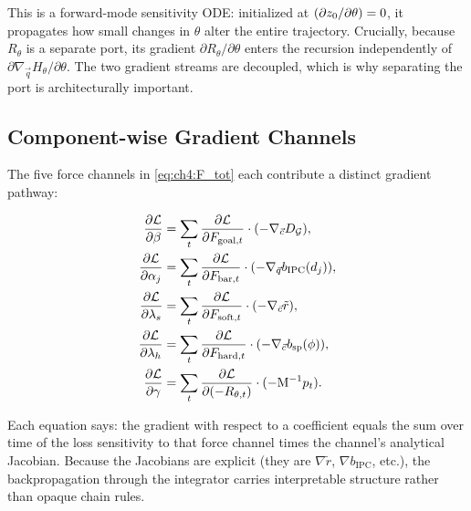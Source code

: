 This is a forward-mode sensitivity ODE: initialized at
$(\partial z_0/\partial\theta) = 0$,
it propagates how small changes in $\theta$ alter the entire trajectory.
Crucially, because $R_\theta$ is a separate port, its gradient
$\partial R_\theta/\partial\theta$ enters the recursion independently
of $\partial\nabla_{\vec{q}} H_\theta/\partial\theta$.
The two gradient streams are decoupled, which is why separating the
port is architecturally important.

\subsection{Component-wise Gradient Channels}
\label{subsec:ch4:grad_channels}

The five force channels in \eqref{eq:ch4:F_tot} each contribute a
distinct gradient pathway:

\begin{align}
  \frac{\partial\mathcal{L}}{\partial\beta}
  &= \sum_t \frac{\partial\mathcal{L}}{\partial F_{\mathrm{goal},t}}
     \cdot (-\nabla_{\vec{c}} D_\mathcal{G}),
  \label{eq:ch4:dL_dbeta} \\
  \frac{\partial\mathcal{L}}{\partial\alpha_j}
  &= \sum_t \frac{\partial\mathcal{L}}{\partial F_{\mathrm{bar},t}}
     \cdot (-\nabla_{\vec{q}} b_{\mathrm{IPC}}(d_j)),
  \label{eq:ch4:dL_dalpha} \\
  \frac{\partial\mathcal{L}}{\partial\lambda_s}
  &= \sum_t \frac{\partial\mathcal{L}}{\partial F_{\mathrm{soft},t}}
     \cdot (-\nabla_{\vec{c}}\tilde{r}),
  \label{eq:ch4:dL_dlambda_s} \\
  \frac{\partial\mathcal{L}}{\partial\lambda_h}
  &= \sum_t \frac{\partial\mathcal{L}}{\partial F_{\mathrm{hard},t}}
     \cdot (-\nabla_{\vec{c}} b_{\mathrm{sp}}(\phi)),
  \label{eq:ch4:dL_dlambda_h} \\
  \frac{\partial\mathcal{L}}{\partial\gamma}
  &= \sum_t \frac{\partial\mathcal{L}}{\partial(-R_{\theta,t})}
     \cdot (-\mathrm{M}^{-1}p_t).
  \label{eq:ch4:dL_dgamma}
\end{align}

Each equation says: the gradient with respect to a coefficient equals the
sum over time of the loss sensitivity to that force channel times the
channel's analytical Jacobian.
Because the Jacobians are explicit (they are $\nabla\tilde{r}$,
$\nabla b_{\mathrm{IPC}}$, etc.), the backpropagation through the
integrator carries interpretable structure rather than opaque chain rules.

